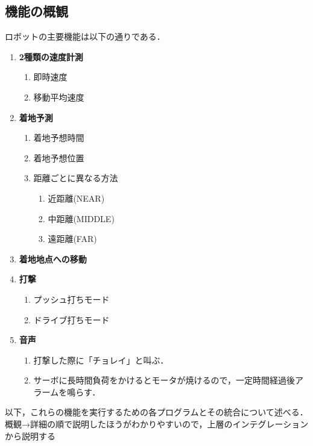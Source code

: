 \documentclass[10pt, oneside, titlepage]{ltjarticle}  %
\begin{document}
  \subsection{機能の概観}
  ロボットの主要機能は以下の通りである．
  \begin{enumerate}
    \item {\bf 2種類の速度計測}
    \begin{enumerate}
      \item 即時速度
      \item 移動平均速度
    \end{enumerate}
    \item {\bf 着地予測}
    \begin{enumerate}
      \item 着地予想時間
      \item 着地予想位置
      \item 距離ごとに異なる方法
      \begin{enumerate}
        \item 近距離(NEAR)
        \item 中距離(MIDDLE)
        \item 遠距離(FAR)
      \end{enumerate}
    \end{enumerate}
    \item {\bf 着地地点への移動}
    \item {\bf 打撃}
    \begin{enumerate}
      \item プッシュ打ちモード
      \item ドライブ打ちモード
    \end{enumerate}
    \item {\bf 音声}
    \begin{enumerate}
      \item 打撃した際に「チョレイ」と叫ぶ．
      \item サーボに長時間負荷をかけるとモータが焼けるので，一定時間経過後アラームを鳴らす．
    \end{enumerate}
  \end{enumerate}

  以下，これらの機能を実行するための各プログラムとその統合について述べる．概観→詳細の順で説明したほうがわかりやすいので，上層のインテグレーションから説明する
\end{document}
